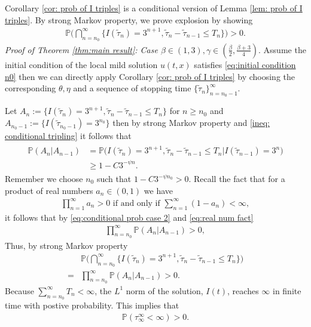 \documentclass[12pt]{article}
\numberwithin{equation}{section}
\begin{document}
Corollary \ref{cor: prob of I triples} is a conditional version of Lemma \ref{lem: prob of I triples}. By strong Markov property, we prove explosion by showing
\begin{align}
    \mathbb{P}\Big(\bigcap_{n=n_0}^\infty \big\{ I(\tilde{\tau}_n)=3^{n+1},\tilde{\tau}_n-\tilde{\tau}_{n-1}\leq T_n\big\}\Big)>0.
\end{align}
\noindent\textit{Proof of Theorem \ref{thm:main result}: Case $\beta\in(1,3),\gamma\in (\frac{\beta}{2},\frac{\beta+3}{4})$}. 
Assume the initial condition of the local mild solution $u(t,x)$ satisfies \eqref{eq:initial condition n0} then we can directly apply Corollary \ref{cor: prob of I triples} by choosing the corresponding $\theta,\eta$ and a sequence of stopping time $\{\tilde{\tau}_n\}_{n=n_0-1}^\infty$.


Let $A_n:=\{I(\tilde{\tau}_n)=3^{n+1},\tilde{\tau}_n-\tilde{\tau}_{n-1}\leq T_n\}$ for $n\geq n_0$ and $A_{n_0-1}:=\{I(\tilde{\tau}_{n_0-1})=3^{n_0}\}$ then by strong Markov property and \eqref{ineq: conditional tripling} it follows that
\begin{align}
    \begin{split}
        \mathbb{P}(A_n|A_{n-1})&= \mathbb{P}\Big(I(\tilde{\tau}_n)=3^{n+1},\tilde{\tau}_n-\tilde{\tau}_{n-1}\leq T_n\Big| I(\tilde{\tau}_{n-1})=3^{n}\Big)\\
    &\geq 1 -C 3^{-\psi n}.
    \end{split}\label{eq:conditional prob case 2}
\end{align}
Remember we choose $n_0$ such that $1-C3^{-\psi n_0}>0$. Recall the fact that for a product of real numbers $a_n\in (0,1)$ we have
\begin{align}
    \prod_{n=1}^\infty a_n>0 \text{ if and only if }\sum_{n=1}^\infty (1-a_n)<\infty,\label{eq:real num fact}
\end{align}
it follows that by \eqref{eq:conditional prob case 2} and \eqref{eq:real num fact}
\begin{align}
    \prod_{n=n_0}^\infty \mathbb{P}(A_n|A_{n-1})>0,
\end{align}
Thus, by strong Markov property
\begin{align}
    &\mathbb{P}\Big(\bigcap_{n=n_0}^\infty \{I(\tilde{\tau}_n)=3^{n+1},\tilde{\tau}_n-\tilde{\tau}_{n-1}\leq T_n\}\Big)\nonumber\\
    =&\prod_{n=n_0}^\infty \mathbb{P}(A_n|A_{n-1})>0.
\end{align}
Because $\sum_{n=n_0}^\infty T_n<\infty$, the $L^1$ norm of the solution, $I(t)$, reaches $\infty$ in finite time with postive probability. This implies that
\begin{align}
    \mathbb{P}(\tau_{\infty}^\infty<\infty)>0.
\end{align}

\newpage
 

\end{document}
